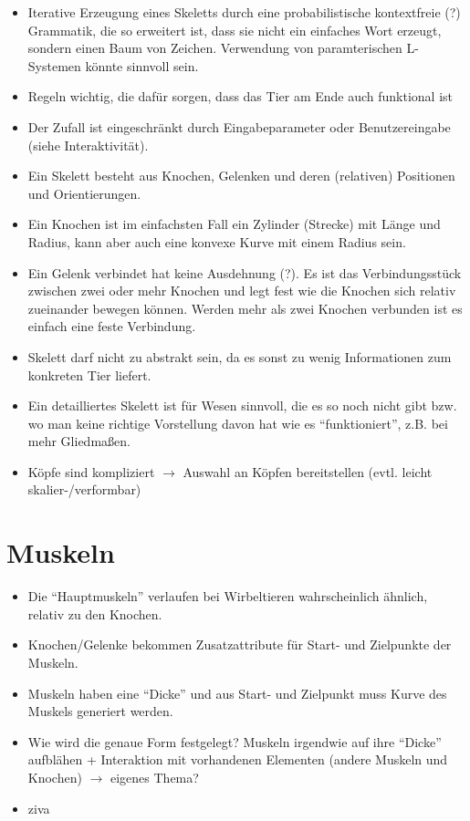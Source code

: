 \begin{itemize}
 \item Iterative Erzeugung eines Skeletts durch eine probabilistische kontextfreie (?) Grammatik, die so erweitert ist, dass sie nicht ein einfaches Wort erzeugt, sondern einen Baum von Zeichen. Verwendung von paramterischen L-Systemen \cite{Paramteric_L-Systems} könnte sinnvoll sein.
 \item Regeln wichtig, die dafür sorgen, dass das Tier am Ende auch funktional ist
 \item Der Zufall ist eingeschränkt durch Eingabeparameter oder Benutzereingabe (siehe Interaktivität).
 \item Ein Skelett besteht aus Knochen, Gelenken und deren (relativen) Positionen und Orientierungen.
 \item Ein Knochen ist im einfachsten Fall ein Zylinder (Strecke) mit Länge und Radius, kann aber auch eine konvexe Kurve mit einem Radius sein.
 \item Ein Gelenk verbindet hat keine Ausdehnung (?). Es ist das Verbindungsstück zwischen zwei oder mehr Knochen und legt fest wie die Knochen sich relativ zueinander bewegen können. Werden mehr als zwei Knochen verbunden ist es einfach eine feste Verbindung.
 \item Skelett darf nicht zu abstrakt sein, da es sonst zu wenig Informationen zum konkreten Tier liefert.
 \item Ein detailliertes Skelett ist für Wesen sinnvoll, die es so noch nicht gibt bzw. wo man keine richtige Vorstellung davon hat wie es "`funktioniert"', z.B. bei mehr Gliedmaßen.
 \item Köpfe sind kompliziert $\rightarrow$ Auswahl an Köpfen bereitstellen (evtl. leicht skalier-/verformbar)
\end{itemize}

\section{Muskeln}

\begin{itemize}
 \item Die "`Hauptmuskeln"' verlaufen bei Wirbeltieren wahrscheinlich ähnlich, relativ zu den Knochen.
 \item Knochen/Gelenke bekommen Zusatzattribute für Start- und Zielpunkte der Muskeln.
 \item Muskeln haben eine "`Dicke"' und aus Start- und Zielpunkt muss Kurve des Muskels generiert werden.
 \item Wie wird die genaue Form festgelegt? Muskeln irgendwie auf ihre "`Dicke"' aufblähen + Interaktion mit vorhandenen Elementen (andere Muskeln und Knochen) $\rightarrow$ eigenes Thema?
 \item ziva %
\end{itemize}


